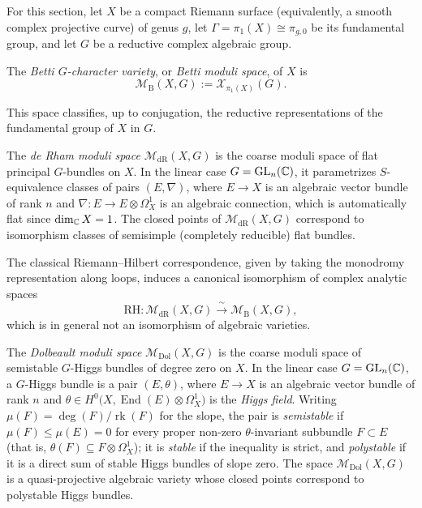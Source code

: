 For this section, let $X$ be a compact Riemann surface (equivalently, a smooth complex projective curve) of genus $g$, let $\Gamma = \pi_1(X) \cong \pi_{g,0}$ be its fundamental group, and let $G$ be a reductive complex algebraic group.

\begin{definition}
    The \emph{Betti $G$-character variety}, or \emph{Betti moduli space}, of $X$ is
    \[
        \mathcal{M}_{\mathrm{B}}(X, G) := \mathcal{X}_{\pi_1(X)}(G).
    \]
\end{definition}

This space classifies, up to conjugation, the reductive representations of the fundamental group of $X$ in $G$.

\begin{definition}
    The \emph{de Rham moduli space} $\mathcal{M}_{\mathrm{dR}}(X, G)$ is the coarse moduli space of flat principal $G$-bundles on $X$. In the linear case $G = \operatorname{GL}_n(\mathbb{C})$, it parametrizes $S$-equivalence classes of pairs $(E, \nabla)$, where $E \to X$ is an algebraic vector bundle of rank $n$ and $\nabla : E \to E \otimes \Omega_X^1$ is an algebraic connection, which is automatically flat since $\dim_{\mathbb{C}} X = 1$. The closed points of $\mathcal{M}_{\mathrm{dR}}(X, G)$ correspond to isomorphism classes of semisimple (completely reducible) flat bundles.
\end{definition}

The classical Riemann--Hilbert correspondence, given by taking the monodromy representation along loops, induces a canonical isomorphism of complex analytic spaces
\[
    \mathrm{RH} : \mathcal{M}_{\mathrm{dR}}(X, G) \xrightarrow{\;\sim\;} \mathcal{M}_{\mathrm{B}}(X, G),
\]
which is in general not an isomorphism of algebraic varieties.

\begin{definition}
    The \emph{Dolbeault moduli space} $\mathcal{M}_{\mathrm{Dol}}(X, G)$ is the coarse moduli space of semistable $G$-Higgs bundles of degree zero on $X$. In the linear case $G = \operatorname{GL}_n(\mathbb{C})$, a $G$-Higgs bundle is a pair $(E, \theta)$, where $E \to X$ is an algebraic vector bundle of rank $n$ and $\theta \in H^0\big(X, \operatorname{End}(E) \otimes \Omega_X^1\big)$ is the \emph{Higgs field}. Writing $\mu(F) = \deg(F)/\operatorname{rk}(F)$ for the slope, the pair is \emph{semistable} if $\mu(F) \leq \mu(E) = 0$ for every proper non-zero $\theta$-invariant subbundle $F \subset E$ (that is, $\theta(F) \subseteq F \otimes \Omega_X^1$); it is \emph{stable} if the inequality is strict, and \emph{polystable} if it is a direct sum of stable Higgs bundles of slope zero. The space $\mathcal{M}_{\mathrm{Dol}}(X, G)$ is a quasi-projective algebraic variety whose closed points correspond to polystable Higgs bundles.
\end{definition}

